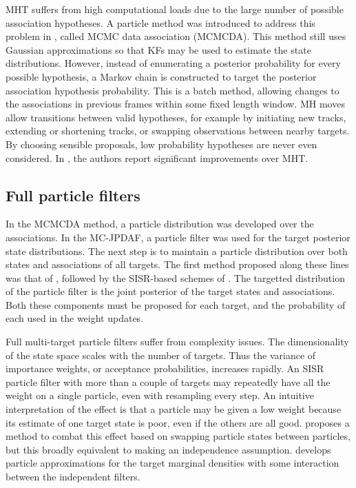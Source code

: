 MHT suffers from high computational loads due to the large number of possible association hypotheses. A particle method was introduced to address this problem in \cite{Oh2004}, called MCMC data association (MCMCDA). This method still uses Gaussian approximations so that KFs may be used to estimate the state distributions. However, instead of enumerating a posterior probability for every possible hypothesis, a Markov chain is constructed to target the posterior association hypothesis probability. This is a batch method, allowing changes to the associations in previous frames within some fixed length window. MH moves allow transitions between valid hypotheses, for example by initiating new tracks, extending or shortening tracks, or swapping observations between nearby targets. By choosing sensible proposals, low probability hypotheses are never even considered. In \cite{Oh2004,Oh2009}, the authors report significant improvements over MHT.



\subsection{Full particle filters}
In the MCMCDA method, a particle distribution was developed over the associations. In the MC-JPDAF, a particle filter was used for the target posterior state distributions. The next step is to maintain a particle distribution over both states and associations of all targets. The first method proposed along these lines was that of \cite{Hue2002}, followed by the SISR-based schemes of \cite{Doucet2002,Vermaak2005}. The targetted distribution of the particle filter is the joint posterior of the target states and associations. Both these components must be proposed for each target, and the probability of each used in the weight updates.

Full multi-target particle filters suffer from complexity issues. The dimensionality of the state space scales with the number of targets. Thus the variance of importance weights, or acceptance probabilities, increases rapidly. An SISR particle filter with more than a couple of targets may repeatedly have all the weight on a single particle, even with resampling every step. An intuitive interpretation of the effect is that a particle may be given a low weight because its estimate of one target state is poor, even if the others are all good. \cite{Orton2002} proposes a method to combat this effect based on swapping particle states between particles, but this broadly equivalent to making an independence assumption. \cite{Maskell2003} develops particle approximations for the target marginal densities with some interaction between the independent filters.


